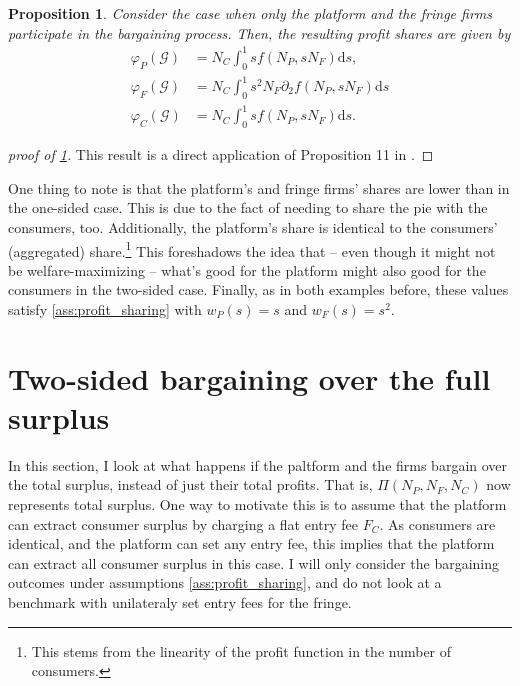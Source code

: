 \documentclass[a4paper]{article}
\newtheorem{proposition}{Proposition}
\newcommand{\ds}{\mathrm{d}s}
\begin{document}
\begin{proposition}
    \label{prop:profit_sharing_two_sided}
    Consider the case when only the platform and the fringe firms participate in the bargaining process.
    Then, the resulting profit shares are given by
    \begin{align*}
        \varphi_P(\mathcal{G}) &= N_C \int_0^1 s f(N_P, s N_F) \ds, \\
        \varphi_F(\mathcal{G}) &= N_C \int_0^1 s^2 N_F \partial_2 f(N_P, s N_F) \ds \\
        \varphi_C(\mathcal{G}) &= N_C \int_0^1 s f(N_P, s N_F) \ds.
    \end{align*}
\end{proposition}
\begin{proof}[proof of \cref{prop:profit_sharing_two_sided}]
    This result is a direct application of Proposition 11 in \textcite{stancsics2023value}.
\end{proof}

One thing to note is that the platform's and fringe firms' shares are lower than in the one-sided case.
This is due to the fact of needing to share the pie with the consumers, too.
Additionally, the platform's share is identical to the consumers' (aggregated) share.\footnote{
    This stems from the linearity of the profit function in the number of consumers.
}
This foreshadows the idea that -- even though it might not be welfare-maximizing -- what's good for the platform might also good for the consumers in the two-sided case.
Finally, as in both examples before, these values satisfy \cref{ass:profit_sharing} with $w_P(s) = s$ and $w_F(s) = s^2$.

\section{Two-sided bargaining over the full surplus}
\label{sec:total_welfare_one_sided}

In this section, I look at what happens if the paltform and the firms bargain over the total surplus, instead of just their total profits.
That is, $\Pi(N_P, N_F, N_C)$ now represents total surplus.
One way to motivate this is to assume that the platform can extract consumer surplus by charging a flat entry fee $F_C$.
As consumers are identical, and the platform can set any entry fee, this implies that the platform can extract all consumer surplus in this case.
I will only consider the bargaining outcomes under assumptions \cref{ass:profit_sharing}, and do not look at a benchmark with unilateraly set entry fees for the fringe.
\end{document}
